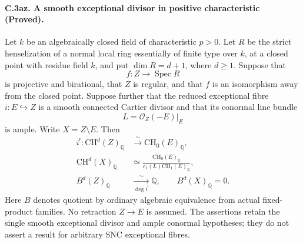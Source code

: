 \paragraph{C.3az. A smooth exceptional divisor in positive characteristic (Proved).}
Let $k$ be an algebraically closed field of characteristic $p>0$.
Let $R$ be the strict henselization of a normal local ring essentially
of finite type over $k$, at a closed point with residue field $k$,
and put $\dim R=d+1$, where $d\ge1$.
Suppose that
\[
 f:Z\longrightarrow\operatorname{Spec}R
\]
is projective and birational, that $Z$ is regular, and that $f$ is
an isomorphism away from the closed point. Suppose further that the
reduced exceptional fibre $i:E\hookrightarrow Z$ is a smooth connected
Cartier divisor and that its conormal line bundle
\[
                         L=\mathcal O_Z(-E)|_E
\]
is ample. Write $X=Z\setminus E$. Then
\begin{align}
 i^!: \mathrm{CH}^d(Z)_{\mathbb Q}
       &\xrightarrow{\ \sim\ }\mathrm{CH}_0(E)_{\mathbb Q},
                  \label{eq:C3az-top}\\
 \mathrm{CH}^d(X)_{\mathbb Q}
       &\simeq
       \frac{\mathrm{CH}_0(E)_{\mathbb Q}}
       {c_1(L)\mathrm{CH}_1(E)_{\mathbb Q}},
                  \label{eq:C3az-quotient}\\
 B^d(Z)_{\mathbb Q}&\xrightarrow[\deg i^!]{\ \sim\ }\mathbb Q,
       \qquad B^d(X)_{\mathbb Q}=0.
                  \label{eq:C3az-B}
\end{align}
Here $B$ denotes quotient by ordinary algebraic equivalence from
actual fixed-product families. No retraction $Z\to E$ is assumed.
The assertions retain the single smooth exceptional divisor and ample
conormal hypotheses; they do not assert a result for arbitrary SNC
exceptional fibres.

